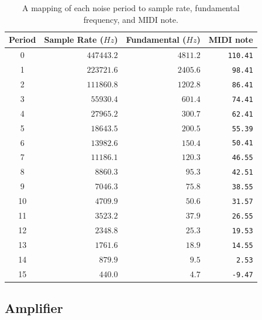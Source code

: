 \documentclass[12pt,letter]{article}
\begin{document}
\begin{table}[!htp]
\centering
\caption{A mapping of each noise period to sample rate, fundamental frequency, and MIDI note.}
\label{tab:noise-periods}
\begin{tabular}{|c||r|r|r|}
\hline
 \bfseries Period  & \bfseries Sample Rate ($Hz$) & \bfseries Fundamental ($Hz$)   & \bfseries MIDI note       \\
\hline\hline
 0       & $447443.2$         & $4811.2$             & \texttt{110.41} \\
\hline
 1       & $223721.6$         & $2405.6$             & \texttt{98.41}  \\
\hline
 2       & $111860.8$         & $1202.8$             & \texttt{86.41}  \\
\hline
 3       & $55930.4$          & $601.4$              & \texttt{74.41}  \\
\hline
 4       & $27965.2$          & $300.7$              & \texttt{62.41}  \\
\hline
 5       & $18643.5$          & $200.5$              & \texttt{55.39}  \\
\hline
 6       & $13982.6$          & $150.4$              & \texttt{50.41}  \\
\hline
 7       & $11186.1$          & $120.3$              & \texttt{46.55}  \\
\hline
 8       & $8860.3$           & $95.3$               & \texttt{42.51}  \\
\hline
 9       & $7046.3$           & $75.8$               & \texttt{38.55}  \\
\hline
 10      & $4709.9$           & $50.6$               & \texttt{31.57}  \\
\hline
 11      & $3523.2$           & $37.9$               & \texttt{26.55}  \\
\hline
 12      & $2348.8$           & $25.3$               & \texttt{19.53}  \\
\hline
 13      & $1761.6$           & $18.9$               & \texttt{14.55}  \\
\hline
 14      & $879.9$            & $9.5$                & \texttt{2.53}   \\
\hline
 15      & $440.0$            & $4.7$                & \texttt{-9.47}  \\
\hline
\end{tabular}
\end{table}

\subsection{Amplifier}
\end{document}
